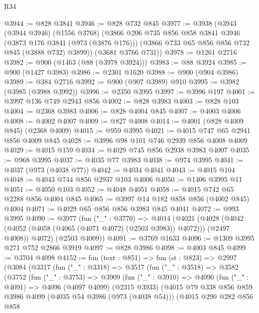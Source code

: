 \begin{lexlean}{R34}
\begin{coremodule}
@3944 := @828 @3841
@3946 := @828 @732 @845
@3977 := @3938
    (@3943
      (@3944 @3946)
      (@1556 @3768)
      (@3866
        @206
        @735
        @856
        @858
        @3841
        @3946
        (@3873 @176 @3841 (@973 (@3876 @176)))
        (@3866 @733 @65 @856 @856 @732 @845 (@3888 @732) @3899))
      (@3681 @3766 @731))
@3978 := @1261 @2716
@3982 := @900 (@1463 (@88 (@3978 @3924)))
@3983 := @88 @3924
@3985 := @900 (@1427 @3983)
@3986 := @2301 @1620
@3988 := @900 (@904 @3986)
@3989 := @384 @2716
@3992 := @900 (@907 @3989) @910
@3995 := @3982 (@3985 (@3988 @3992))
@3996 := @2350 @3995
@3997 := @3996 @197
@4001 := @3997 @136 @749 @2943 @856
@4002 := @828 @3983
@4003 := @828 @103
@4004 := @2368 @3983
@4006 := @828 @4004 @845
@4007 := @4003 @4006
@4008 := @4002 @4007
@4009 := @827 @4008
@4014 := @4001 (@828 @4009 @845) (@2368 @4009)
@4015 := @959 @3995
@4021 := @4015 @747 @65 @2941 @856 @4009 @845
@4028 := @3996 @98 @101 @746 @2939 @856 @4008 @4009
@4029 := @4015 @159
@4034 := @4029 @745 @856 @2938 @3983 @4007
@4035 := @968 @3995
@4037 := @4035 @77 @3983
@4038 := @974 @3995
@4041 := @4037 (@973 (@4038 @77))
@4042 := @4034 @4041
@4043 := @4015 @104
@4048 := @4043 @744 @856 @2937 @103 @4006
@4050 := @1406 @3995 @11
@4051 := @4050 @103
@4052 := @4048 @4051
@4058 := @4015 @742 @65 @2288 @856 @4004 @845
@4065 := @3997 @14 @182 @858 @856 (@4002 @845) @4004
@4071 := @4029 @65 @856 @856 @3983 @845 @4041
@4072 := @993 @3995
@4090 := @3977
    (fun ("_" : @3770) =>
    @4014
      (@4021
        (@4028 (@4042 (@4052 (@4058 (@4065 (@4071 @4072) (@2503 @3983)) @4072))) (@2497 @4008))
        @4072)
      (@2503 @4009))
@4091 := @3769 @1633
@4096 := @1309 @3995 @271 @752 @2866 @3919
@4097 := @828 @3986
@4098 := @4003 @845
@4099 := @3704 @4098
@4152 := fun (text : @851) =>
  fun (st : @823) =>
  @2997
    (@3084
      (@3317
        (fun ("_" : @3318) =>
        @3517
          (fun ("_" : @3518) =>
          @3582
            (@3752
              (fun ("_" : @3753) =>
              @3909
                (fun ("_" : @3910) =>
                @4090
                  (fun ("_" : @4091) =>
                  @4096
                    (@4097 @4099)
                    (@2315 @3933)
                    (@4015
                      @79
                      @338
                      @856
                      @859
                      @3986
                      @4099
                      (@4035 @54 @3986 (@973 (@4038 @54)))
                      (@4015
                        @290
                        @282
                        @856
                        @858

\end{coremodule}
\end{lexlean}
